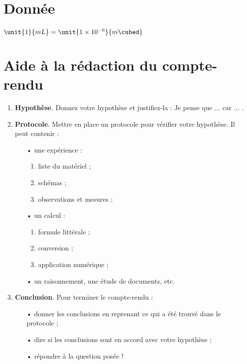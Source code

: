 \documentclass[12pt,a4paper]{article}
\begin{document}
\section*{Donnée}

$ \unit{1}{mL} = \unit{1\times 10^{-6}}{m\cubed}$

\section*{Aide à la rédaction du compte-rendu}

\begin{enumerate}
\item \textbf{Hypothèse}.
Donnez votre hypothèse et justifiez-la : \og Je pense que ... car ... \fg{}.
\item \textbf{Protocole}.
Mettre en place un protocole pour vérifier votre hypothèse. Il peut contenir :
\begin{itemize}
\item[•] une expérience :
\begin{enumerate}
\item liste du matériel ;
\item schémas ;
\item observations et mesures ;
\end{enumerate}
\item[•] un calcul :
\begin{enumerate}
\item formule littérale ;
\item conversion ;
\item application numérique ;
\end{enumerate}
\item[•] un raisonnement, une étude de documents, etc.
\end{itemize}
\item \textbf{Conclusion}. Pour terminer le compte-rendu :
\begin{itemize}
\item[•] donner les conclusions en reprenant ce qui a été trouvé dans le protocole ;
\item[•] dire si les conclusions sont en accord avec votre hypothèse ;
\item[•] répondre à la question posée !
\end{itemize}
\end{enumerate}
\end{document}
